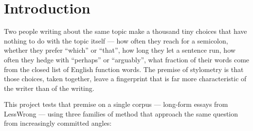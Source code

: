 \documentclass[11pt]{article}
\begin{document}
\begin{abstract}
\noindent We study \textbf{authorship stylometry} on long-form essays drawn from the
LessWrong platform. From a single crawling pipeline we build three custom
sub-datasets, each shaped to fit a different downstream task, and ask three
questions of growing difficulty.
\textit{First}, can an unsupervised method recover author identity from style alone?
We use \textbf{K-means} on $107$ stylometric features and trace how clustering
quality depends on the number of authors, articles per author, article length,
and the era in which a piece was written. \textit{Second}, can a supervised model
decide whether two previously unseen articles share an author? We frame this as
binary same-author detection with a \textbf{Support Vector Machine} on engineered
pair features, and compare it against a \textbf{Logistic Regression} baseline.
\textit{Third}, can a model identify the author of a article from a closed set,
while also refusing to attribute work to anyone outside that set? We train a
small \textbf{neural network} as a six-way classifier that includes an explicit
``none-of-the-above'' class. Each method tells a slightly different story about
the same underlying signal --- and together they show that stylistic identity in
long-form essays is strong, mostly linearly accessible, and remarkably stable
once a few practical pitfalls are handled.
\end{abstract}

\vspace{0.8em}
{\setcounter{tocdepth}{2}\small\tableofcontents}
\clearpage

\section{Introduction}
\label{sec:intro}

Two people writing about the same topic make a thousand tiny choices that have
nothing to do with the topic itself --- how often they reach for a semicolon,
whether they prefer ``which'' or ``that'', how long they let a sentence run, how
often they hedge with ``perhaps'' or ``arguably'', what fraction of their words
come from the closed list of English function words. The premise of stylometry
is that those choices, taken together, leave a fingerprint that is far more
characteristic of the writer than of the writing.

This project tests that premise on a single corpus --- long-form essays from
LessWrong --- using three families of method that approach the same question
from increasingly committed angles:
\end{document}
